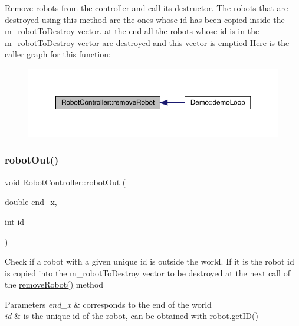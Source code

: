 Remove robots from the controller and call its destructor. The robots that are destroyed using this method are the ones whose id has been copied inside the m\+\_\+robot\+To\+Destroy vector.  at the end all the robots whose id is in the m\+\_\+robot\+To\+Destroy vector are destroyed and this vector is emptied Here is the caller graph for this function\+:\nopagebreak
\begin{figure}[H]
\begin{center}
\leavevmode
\includegraphics[width=350pt]{class_robot_controller_a0774831ed97c92f24d082603e66950b0_icgraph}
\end{center}
\end{figure}
\mbox{\label{class_robot_controller_a68972b0f0f2f033ee0d2d2c849fb38c9}} 
\subsubsection{\texorpdfstring{robot\+Out()}{robotOut()}}
{\footnotesize\ttfamily void Robot\+Controller\+::robot\+Out (\begin{DoxyParamCaption}\item[{double}]{end\+\_\+x,  }\item[{int}]{id }\end{DoxyParamCaption})}

Check if a robot with a given unique id is outside the world. If it is the robot id is copied into the m\+\_\+robot\+To\+Destroy vector to be destroyed at the next call of the \mbox{\hyperlink{class_robot_controller_a0774831ed97c92f24d082603e66950b0}{remove\+Robot()}} method 
\begin{DoxyParams}{Parameters}
{\em end\+\_\+x} & corresponds to the end of the world \\
\hline
{\em id} & is the unique id of the robot, can be obtained with robot.\+get\+I\+D() \\
\hline
\end{DoxyParams}
\mbox{\label{class_robot_controller_a927abf2765cd53b39acf128f318c3fe5}} 
